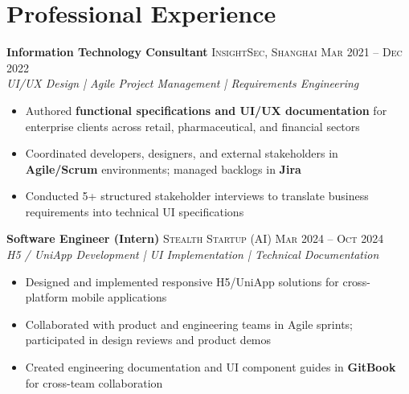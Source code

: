 \documentclass{simpleresume}
\begin{document}
\section{Professional Experience}
\noindent\textbf{Information Technology Consultant}
  \hfill{\sffamily\scshape\small\color{secondary}InsightSec, Shanghai}
  \hfill{\sffamily\scshape\small\color{muted}Mar 2021 -- Dec 2022}\\
  {\itshape\color{secondary}UI/UX Design | Agile Project Management | Requirements Engineering}
\vspace{-0.25mm}
\begin{itemize}
  \item Authored \textbf{functional specifications and UI/UX documentation} for enterprise clients across retail, pharmaceutical, and financial sectors
  \item Coordinated developers, designers, and external stakeholders in \textbf{Agile/Scrum} environments; managed backlogs in \textbf{Jira}
  \item Conducted 5+ structured stakeholder interviews to translate business requirements into technical UI specifications
\end{itemize}

\vspace{0.08cm}
\noindent\textbf{Software Engineer (Intern)}
  \hfill{\sffamily\scshape\small\color{secondary}Stealth Startup (AI)}
  \hfill{\sffamily\scshape\small\color{muted}Mar 2024 -- Oct 2024}\\
  {\itshape\color{secondary}H5 / UniApp Development | UI Implementation | Technical Documentation}
\vspace{-0.25mm}
\begin{itemize}
  \item Designed and implemented responsive H5/UniApp solutions for cross-platform mobile applications
  \item Collaborated with product and engineering teams in Agile sprints; participated in design reviews and product demos
  \item Created engineering documentation and UI component guides in \textbf{GitBook} for cross-team collaboration
\end{itemize}

\end{document}

